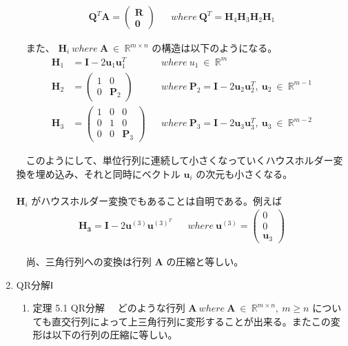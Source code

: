 \documentclass[dvipdfmx,10pt,presentation]{beamer}
\begin{document}
\begin{enumerate}
\begin{align*}
\bm{Q}^T\bm{A}=
\begin{pmatrix}
\bm{R} \\
\bm{0}
\end{pmatrix}
&& where\ \bm{Q}^T =\bm{H}_4\bm{H}_3\bm{H}_2\bm{H}_1
\end{align*}

　また、 \(\bm{H}_i\ where\ \bm{A}\ \in\ \mathbb{R}^{m\times n}\) の構造は以下のようになる。\\

\begin{align}
\bm{H}_1 &= \bm{I} - 2\bm{u}_1\bm{u}_1^T && where\ u_1\ \in\ \mathbb{R}^m \nonumber \\
\bm{H}_2 &= 
\begin{pmatrix}
1 & 0 \\
0 & \bm{P}_2
\end{pmatrix}
&& where\ \bm{P}_2=\bm{I} - 2\bm{u}_2\bm{u}_2^T,\ \bm{u}_2\ \in\ \mathbb{R}^{m-1}
\nonumber \\ 
\bm{H}_3 &= 
\begin{pmatrix}
1 & 0 & 0 \\
0 & 1 & 0 \\
0 & 0 & \bm{P}_3 
\end{pmatrix}
&& where\ \bm{P}_3=\bm{I} - 2\bm{u}_3\bm{u}_3^T,\ \bm{u}_3\ \in\ \mathbb{R}^{m-2}
\tag{5.1}
\end{align}



　このようにして、単位行列に連続して小さくなっていくハウスホルダー変換を埋め込み、それと同時にベクトル \(\bm{u}_i\) の次元も小さくなる。\\
　\\
\(\bm{H}_i\) がハウスホルダー変換でもあることは自明である。例えば\\

\begin{align*}
\bm{H_3} = \bm{I} - 2 \bm{u}^{(3)} \bm{u}^{(3)^T} 
&&  where\ \bm{u}^{(3)}=
\begin{pmatrix}
0 \\
0 \\
\bm{u}_3
\end{pmatrix}
\end{align*}

　尚、三角行列への変換は行列 \(\bm{A}\) の圧縮と等しい。\\
\item QR分解Ⅰ
\label{sec:orge40b4f0}

\begin{enumerate}
\item 定理 5.1 QR分解
\label{sec:orgd9e82b0}
　どのような行列 \(\bm{A}\ where\ \bm{A}\ \in\ \mathbb{R}^{m\times n},\ m \geq n\) についても直交行列によって上三角行列に変形することが出来る。またこの変形は以下の行列の圧縮に等しい。\\


\end{enumerate}
\end{enumerate}
\end{document}
